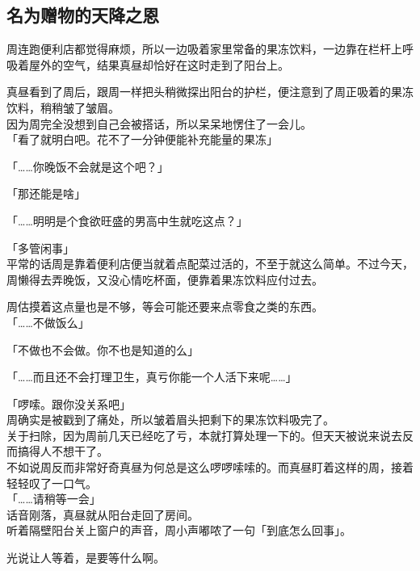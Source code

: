 \subsection{名为赠物的天降之恩}

周连跑便利店都觉得麻烦，所以一边吸着家里常备的果冻饮料，一边靠在栏杆上呼吸着屋外的空气，结果真昼却恰好在这时走到了阳台上。

真昼看到了周后，跟周一样把头稍微探出阳台的护栏，便注意到了周正吸着的果冻饮料，稍稍皱了皱眉。\\

因为周完全没想到自己会被搭话，所以呆呆地愣住了一会儿。\\

「看了就明白吧。花不了一分钟便能补充能量的果冻」

「……你晚饭不会就是这个吧？」

「那还能是啥」

「……明明是个食欲旺盛的男高中生就吃这点？」

「多管闲事」\\

平常的话周是靠着便利店便当就着点配菜过活的，不至于就这么简单。不过今天，周懒得去弄晚饭，又没心情吃杯面，便靠着果冻饮料应付过去。

周估摸着这点量也是不够，等会可能还要来点零食之类的东西。\\

「……不做饭么」

「不做也不会做。你不也是知道的么」

「……而且还不会打理卫生，真亏你能一个人活下来呢……」

「啰嗦。跟你没关系吧」\\

周确实是被戳到了痛处，所以皱着眉头把剩下的果冻饮料吸完了。\\

关于扫除，因为周前几天已经吃了亏，本就打算处理一下的。但天天被说来说去反而搞得人不想干了。\\

不如说周反而非常好奇真昼为何总是这么啰啰嗦嗦的。而真昼盯着这样的周，接着轻轻叹了一口气。\\

「……请稍等一会」\\

话音刚落，真昼就从阳台走回了房间。\\

听着隔壁阳台关上窗户的声音，周小声嘟哝了一句「到底怎么回事」。

光说让人等着，是要等什么啊。\\

